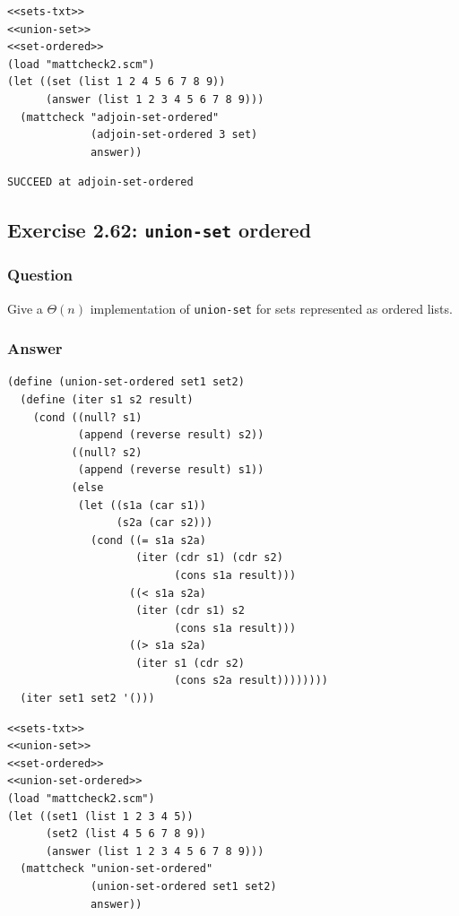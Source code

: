 \documentclass[final,fleqn,titlepage,twoside]{article}
\begin{document}
\begin{verbatim}
<<sets-txt>>
<<union-set>>
<<set-ordered>>
(load "mattcheck2.scm")
(let ((set (list 1 2 4 5 6 7 8 9))
      (answer (list 1 2 3 4 5 6 7 8 9)))
  (mattcheck "adjoin-set-ordered"
             (adjoin-set-ordered 3 set)
             answer))
\end{verbatim}

\begin{verbatim}
SUCCEED at adjoin-set-ordered
\end{verbatim}

\subsection{Exercise 2.62: \texttt{union-set} ordered}
\label{sec:org7162e98}
\subsubsection{Question}
\label{sec:org1b6e6f5}
Give a \(\Theta(n)\) implementation of \texttt{union-set} for sets
represented as ordered lists.

\subsubsection{Answer}
\label{sec:org671123e}
\begin{verbatim}
(define (union-set-ordered set1 set2)
  (define (iter s1 s2 result)
    (cond ((null? s1)
           (append (reverse result) s2))
          ((null? s2)
           (append (reverse result) s1))
          (else
           (let ((s1a (car s1))
                 (s2a (car s2)))
             (cond ((= s1a s2a)
                    (iter (cdr s1) (cdr s2)
                          (cons s1a result)))
                   ((< s1a s2a)
                    (iter (cdr s1) s2
                          (cons s1a result)))
                   ((> s1a s2a)
                    (iter s1 (cdr s2)
                          (cons s2a result))))))))
  (iter set1 set2 '()))
\end{verbatim}

\begin{verbatim}
<<sets-txt>>
<<union-set>>
<<set-ordered>>
<<union-set-ordered>>
(load "mattcheck2.scm")
(let ((set1 (list 1 2 3 4 5))
      (set2 (list 4 5 6 7 8 9))
      (answer (list 1 2 3 4 5 6 7 8 9)))
  (mattcheck "union-set-ordered"
             (union-set-ordered set1 set2)
             answer))
\end{verbatim}
\end{document}
